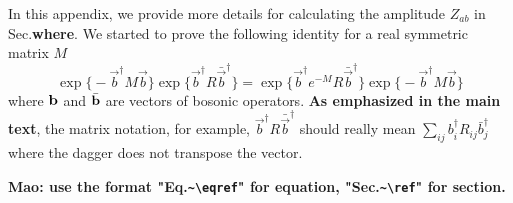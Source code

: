 
In this appendix, we provide more details for calculating the amplitude $Z_{ab}$ in Sec.{\bf\color{red}where}. We started to prove the following identity for a real symmetric matrix $M$
\begin{equation}
\label{1st id in app.pf_of_id}
\exp\Big\{- \vec{b}^{\dagger} M \vec{b}  \Big\} \exp \Big\{ \vec{b}^{\dagger} R \bar{\vec{b}}^{\dagger}  \Big\}  = \exp \Big\{ \vec{b}^{\dagger} e^{-M}  R \bar{\vec{b}}^{\dagger}  \Big\} \exp\Big\{- \vec{b}^{\dagger} M \vec{b}  \Big\} 
\end{equation}
where ${\bf b}$ and $\bar{\bf b}$ are vectors of bosonic operators. {\bf\color{red}As emphasized in the main text}, the matrix notation, for example, $\vec{b}^{\dagger} R \bar{\vec{b}}^{\dagger}$ should really mean $\sum_{ij}b^\dagger_iR_{ij}\bar{b}_j^\dagger$ where the dagger does not transpose the vector.  

{\bf \color{red}Mao: use the format "Eq.\verb|~\eqref|{}" for equation, "Sec.\verb|~\ref|{}" for section. }

